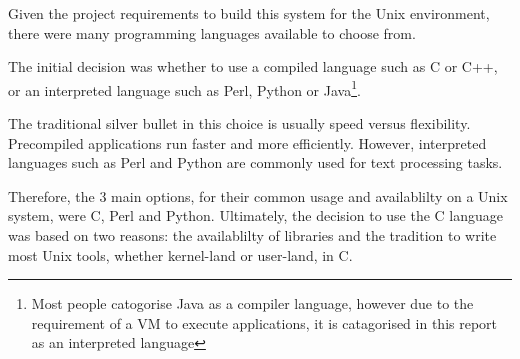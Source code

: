 
Given the project requirements to build this system for the Unix
environment, there were many programming languages available to choose
from.


The initial decision was whether to use a compiled language such as C or
C++, or an interpreted language such as Perl, Python or
Java\footnote{Most people catogorise Java as a compiler language,
however due to the requirement of a VM to execute applications, it is
catagorised in this report as an interpreted language}. 


The traditional silver bullet in this choice is usually speed versus 
flexibility. Precompiled applications run faster and more efficiently. 
However, interpreted languages such as Perl and Python are commonly
used for text processing tasks. 


Therefore, the 3 main options, for their common usage and availablilty 
on a Unix system, were C, Perl and Python. Ultimately, the decision to 
use the C language was based on two reasons: the availablilty of 
libraries and the tradition to write most Unix tools, whether 
kernel-land or user-land, in C.
